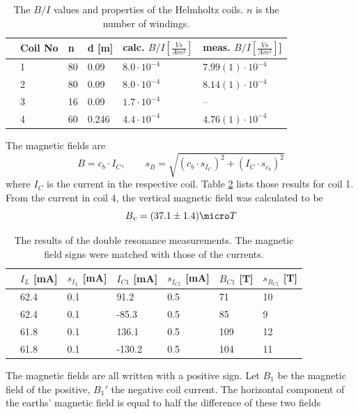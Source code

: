 \begin{table}\centering
	\begin{tabular}{@{}llllll@{}}
		\toprule
		&Coil No&n &d [m]&calc. $\unit{B/I}{[\frac{Vs}{Am^2}]}$&meas. $\unit{B/I}{[\frac{Vs}{Am^2}]}$]\\ 
		\midrule
		&1&80&0.09&$8.0\cdot10^{-4}$&$7.99(1)\cdot10^{-4}$\\
		&2&80&0.09&$8.0\cdot10^{-4}$&$8.14(1)\cdot10^{-4}$\\
		&3&16&0.09&$1.7\cdot10^{-4}$&--\\
		&4&60&0.246&$4.4\cdot10^{-4}$&$4.76(1)\cdot10^{-4}$\\
		\bottomrule
	\end{tabular}
	\caption[Properties of the magnetic field coils]{The $B/I$ values and properties of the Helmholtz coils. $n$ is the number of windings. \cite{anleitung}}
	\label{tb:coilconstants}
\end{table}
The magnetic fields are
\begin{equation}
B=c_b\cdot I_C,\qquad s_B=\sqrt{(c_b\cdot s_{I_C})^2+(I_C\cdot s_{c_b})^2}
\end{equation}
where $I_C$ is the current in the respective coil. Table \ref{tb:doubleresonance} lists those results for coil 1.\\ From the current in coil 4, the vertical magnetic field was calculated to be
\begin{equation}
B_v=\unit{(37.1\pm1.4)}{\micro T}
\end{equation}
\begin{table}\centering
	\begin{tabular}{@{}lllllll@{}}
		\toprule
		&$I_L$ [mA]&$s_{I_L}$ [mA]&$I_{C1}$	[mA]&$s_{I_{C1}}$ [mA]&$B_{C1}$ [\micro T]&$s_{B_{C1}}$ [\micro T]\\ 
		\midrule
		&62.4&0.1&91.2&0.5&71&10\\
		&62.4&0.1&-85.3&0.5&85&9\\
		&61.8&0.1&136.1&0.5&109&12\\
		&61.8&0.1&-130.2&0.5&104&11\\
		\bottomrule
	\end{tabular}
	\caption[Results of the double resonance measurements]{The results of the double resonance measurements. The magnetic field signs were matched with those of the currents.}
	\label{tb:doubleresonance}
\end{table}
The magnetic fields are all written with a positive sign. Let $B_1$ be the magnetic field of the positive, $B_1'$ the negative coil current. The horizontal component of the earths' magnetic field is equal to half the difference of these two fields
